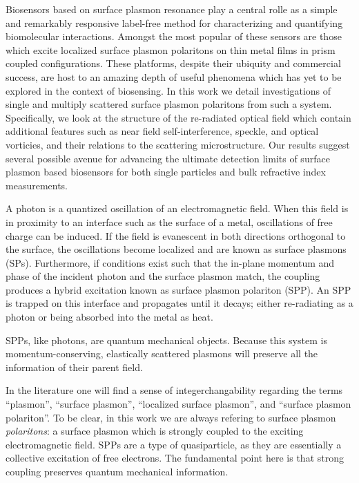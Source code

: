 Biosensors based on surface plasmon resonance play a central rolle as a
simple and remarkably responsive label-free method for characterizing and
quantifying biomolecular interactions.  Amongst the most popular of these
sensors are those which excite localized surface plasmon polaritons on thin
metal films in prism coupled configurations.  These platforms, despite
their ubiquity and commercial success, are host to an amazing depth of
useful phenomena which has yet to be explored in the context of biosensing.
In this work we detail investigations of single and multiply scattered
surface plasmon polaritons from such a system.  Specifically, we look at
the structure of the re-radiated optical field which contain additional
features such as near field self-interference, speckle, and optical
vorticies, and their relations to the scattering microstructure.  Our
results suggest several possible avenue for advancing the ultimate
detection limits of surface plasmon based biosensors for both single
particles and bulk refractive index measurements.

A photon is a quantized oscillation of an electromagnetic field.  When this
field is in proximity to an interface such as the surface of a metal,
oscillations of free charge can be induced.  If the field is evanescent in
both directions orthogonal to the surface, the oscillations become
localized and are known as surface plasmons (SPs).  Furthermore, if
conditions exist such that the in-plane momentum and phase of the incident
photon and the surface plasmon match, the coupling produces a hybrid
excitation known as surface plasmon polariton (SPP).  An SPP is trapped on
this interface and propagates until it decays; either re-radiating as a
photon or being absorbed into the metal as heat.

SPPs, like photons, are quantum mechanical objects.  Because this system is
momentum-conserving, elastically scattered plasmons will preserve all the
information of their parent field.  

In the literature one will find a sense of integerchangability regarding
the terms ``plasmon'', ``surface plasmon'', ``localized surface plasmon'',
and ``surface plasmon polariton''.  To be clear, in this work we are always
refering to surface plasmon \textit{polaritons}: a surface plasmon which is
strongly coupled to the exciting electromagnetic field.  SPPs are a type of
quasiparticle, as they are essentially a collective excitation of free
electrons.  The fundamental point here is that strong coupling preserves
quantum mechanical information.

